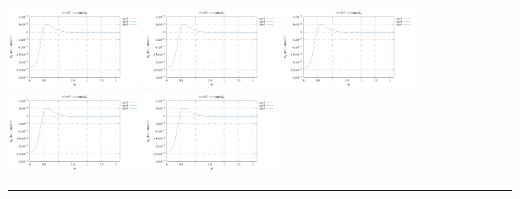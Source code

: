 \noindent
\includegraphics[width=3.5cm]{python_codes/fieldstone_152/RESULTS/exp3/err_64_m2}
\includegraphics[width=3.5cm]{python_codes/fieldstone_152/RESULTS/exp3/err_64_m3}
\includegraphics[width=3.5cm]{python_codes/fieldstone_152/RESULTS/exp3/err_64_m4}
\includegraphics[width=3.5cm]{python_codes/fieldstone_152/RESULTS/exp3/err_64_m5}
\includegraphics[width=3.5cm]{python_codes/fieldstone_152/RESULTS/exp3/err_64_m6}

\hrule

